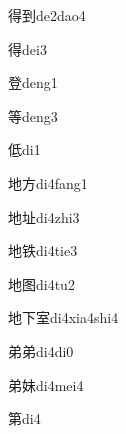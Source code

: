 \begin{verbete}[11;8]{得到}{de2dao4}
\end{verbete}

\begin{verbete}[11]{得}{dei3}
\end{verbete}

\begin{verbete}[12]{登}{deng1}
\end{verbete}

\begin{verbete}[12]{等}{deng3}
\end{verbete}

\begin{verbete}[7]{低}{di1}
\end{verbete}

\begin{verbete}[6;4]{地方}{di4fang1}
\end{verbete}

\begin{verbete}[6;7]{地址}{di4zhi3}
\end{verbete}

\begin{verbete}[6;10]{地铁}{di4tie3}
\end{verbete}

\begin{verbete}[6;8]{地图}{di4tu2}
\end{verbete}

\begin{verbete}[6;3;9]{地下室}{di4xia4shi4}
\end{verbete}

\begin{verbete}[7;7]{弟弟}{di4di0}
\end{verbete}

\begin{verbete}[7;8]{弟妹}{di4mei4}
\end{verbete}

\begin{verbete}[11]{第}{di4}
\end{verbete}

